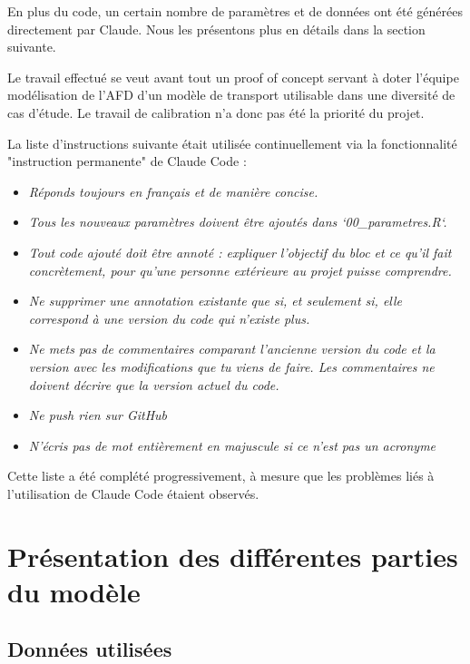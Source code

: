 \documentclass[12pt,a4paper,french]{report}
\begin{document}
	En plus du code, un certain nombre de paramètres et de données ont été générées directement par Claude. Nous les présentons plus en détails dans la section suivante. 
	
	Le travail effectué se veut avant tout un proof of concept servant à doter l'équipe modélisation de l'AFD d'un modèle de transport utilisable dans une diversité de cas d'étude. Le travail de calibration n'a donc pas été la priorité du projet.
	
	La liste d'instructions suivante était utilisée continuellement via la fonctionnalité "instruction permanente" de Claude Code : 
	
	\begin{itemize}
		\item  \textit{Réponds toujours en français et de manière concise.}
		\item \textit{Tous les nouveaux paramètres doivent être ajoutés dans `00\_parametres.R`.}
		\item \textit{Tout code ajouté doit être annoté : expliquer l'objectif du bloc et ce qu'il fait concrètement, pour qu'une personne extérieure au projet puisse comprendre.}
		\item \textit{Ne supprimer une annotation existante que si, et seulement si, elle correspond à une version du code qui n'existe plus.}
		\item \textit{Ne mets pas de commentaires comparant l'ancienne version du code et la version avec les modifications que tu viens de faire. Les commentaires ne doivent décrire que la version actuel du code.}
		\item \textit{Ne push rien sur GitHub}
		\item \textit{N'écris pas de mot entièrement en majuscule si ce n'est pas un acronyme}
	\end{itemize}
	
	Cette liste a été complété progressivement, à mesure que les problèmes liés à l'utilisation de Claude Code étaient observés.
	

	\section{Présentation des différentes parties du modèle}
	\label{pres_modele}
	
	\subsection{Données utilisées}
	\label{subsec:donnees}
	
\end{document}

